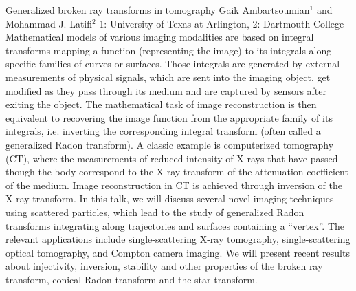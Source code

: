 \begin{addmargin}[2em]{0em}
\vspace{1.5ex}
\abs
{Generalized broken ray transforms in tomography}
{Gaik Ambartsoumian$^{1}$ and Mohammad J. Latifi$^{2}$}
{1: University of Texas at Arlington, 2: Dartmouth College}
{Mathematical models of various imaging modalities are based on integral transforms mapping a function (representing the image) to its integrals along specific families of curves or surfaces. Those integrals are generated by external measurements of physical signals, which are sent into the imaging object, get modified as they pass through its medium and are captured by sensors after exiting the object. The mathematical task of image reconstruction is then equivalent to recovering the image function from the appropriate family of its integrals, i.e. inverting the corresponding integral transform (often called a generalized Radon transform).  A classic example is computerized tomography (CT), where the measurements of reduced intensity of X-rays that have passed though the body correspond to the X-ray transform of the attenuation coefficient of the medium. Image reconstruction in CT is achieved through inversion of the X-ray transform. In this talk, we will discuss several novel imaging techniques using scattered particles, which lead to the study of generalized Radon transforms integrating along trajectories and surfaces containing a ``vertex''.  The relevant applications include single-scattering X-ray tomography, single-scattering optical tomography, and Compton camera imaging. We will present recent results about injectivity, inversion, stability and other properties of the broken ray transform, conical Radon transform and the star transform.}



\end{addmargin}
